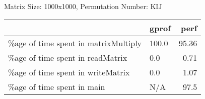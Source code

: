 \documentclass{article}
\begin{document}
    Matrix Size: 1000x1000, Permutation Number: KIJ \\
    \begin{tabular}{llr}
\hline
                                      & gprof   &   perf \\
\hline
 \%age of time spent in matrixMultiply & 100.0   &  95.36 \\
 \%age of time spent in readMatrix     & 0.0     &   0.71 \\
 \%age of time spent in writeMatrix    & 0.0     &   1.07 \\
 \%age of time spent in main           & N/A     &  97.5  \\
\hline
\end{tabular}
    
\end{document}
